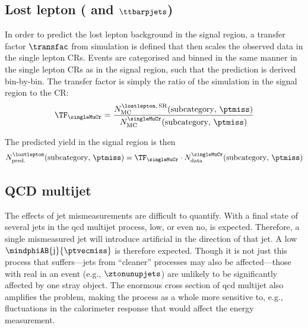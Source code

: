 

\subsection{Lost lepton (\texorpdfstring{\PW}{W} and \texorpdfstring{$\ttbarpjets$}{ttbar plus jets})}
\label{subsec:htoinv_lost_lepton_bkg}

In order to predict the lost lepton background in the signal region, a transfer factor $\transfac$ from simulation is defined that then scales the observed data in the single lepton \glspl{CR}. Events are categorised and binned in the same manner in the single lepton \glspl{CR} as in the signal region, such that the prediction is derived bin-by-bin. The transfer factor is simply the ratio of the simulation in the signal region to the \gls{CR}:
\begin{equation}
    \TF_{\singleMuCr} = \frac{ N_{\mathrm{MC}}^{\lostlepton, \, \mathrm{SR}}(\mathrm{subcategory}, \, \ptmiss) }{ N_{\mathrm{MC}}^{\singleMuCr}(\mathrm{subcategory}, \, \ptmiss) }
\end{equation}

The predicted yield in the signal region is then
\begin{equation}
    N_{\mathrm{pred.}}^{\lostlepton}(\mathrm{subcategory}, \, \ptmiss) = \TF_{\singleMuCr} \cdot N_{\mathrm{data}}^{\singleMuCr}(\mathrm{subcategory}, \, \ptmiss)
\end{equation}





\subsection{\texorpdfstring{\ztonunupjets}{Z to nunu + jets}}
\label{subsec:htoinv_znunu_bkg}




\subsection{QCD multijet}
\label{subsec:htoinv_qcd_multijet_bkg}

The effects of \gls{jet} mismeasurements are difficult to quantify. With a final state of several \glspl{jet} in the \acrshort{qcd} multijet process, low, or even no, \ptvecmiss is expected. Therefore, a single mismeasured \gls{jet} will introduce artificial \ptvecmiss in the direction of that jet. A low $\mindphiAB{\mathrm{j}}{\ptvecmiss}$ is therefore expected. Though it is not just this process that suffers---\glspl{jet} from ``cleaner'' processes may also be affected---those with real \ptmiss in an event (e.g., $\ztonunupjets$) are unlikely to be significantly affected by one stray object. The enormous cross section of \acrshort{qcd} multijet also amplifies the problem, making the process as a whole more sensitive to, e.g., fluctuations in the calorimeter response that would affect the energy measurement.

